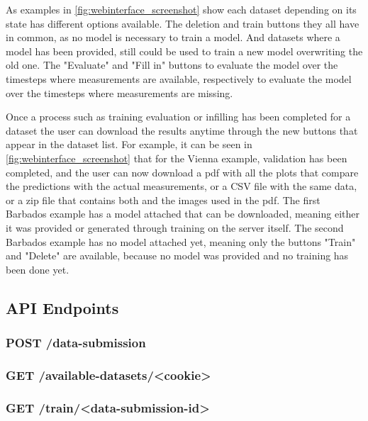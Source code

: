 As examples in \autoref{fig:webinterface_screenshot} show each dataset depending on its state has different options available. The deletion and train buttons they all have in common, as no model is necessary to train a model. And datasets where a model has been provided, still could be used to train a new model overwriting the old one. The "Evaluate" and "Fill in" buttons to evaluate the model over the timesteps where measurements are available, respectively to evaluate the model over the timesteps where measurements are missing.

Once a process such as training evaluation or infilling has been completed for a dataset the user can download the results anytime through the new buttons that appear in the dataset list. For example, it can be seen in \autoref{fig:webinterface_screenshot} that for the Vienna example, validation has been completed, and the user can now download a pdf with all the plots that compare the predictions with the actual measurements, or a CSV file with the same data, or a zip file that contains both and the images used in the pdf. The first Barbados example has a model attached that can be downloaded, meaning either it was provided or generated through training on the server itself. The second Barbados example has no model attached yet, meaning only the buttons "Train" and "Delete" are available, because no model was provided and no training has been done yet. 


\subsection{API Endpoints}
\label{sec:api}

\subsubsection*{POST /data-submission}

\subsubsection*{GET /available-datasets/<cookie>}

\subsubsection*{GET /train/<data-submission-id>}


